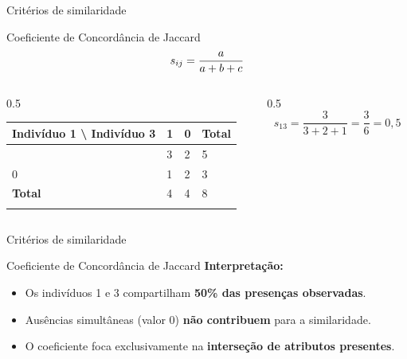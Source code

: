 \documentclass[
  ignorenonframetext,
  aspectratio=169,
]{beamer}
\providecommand{\tightlist}{%
  \setlength{\itemsep}{0pt}\setlength{\parskip}{0pt}}
\begin{document}
\begin{frame}{Critérios de similaridade}
\label{crituxe9rios-de-similaridade-4}
\begin{block}{Coeficiente de Concordância de Jaccard}
\label{coeficiente-de-concorduxe2ncia-de-jaccard}
\[\Large s_{ij} = \displaystyle{\frac{a}{a + b + c}}\]

\begin{columns}[T]
\begin{column}{0.5\linewidth}
\begin{longtable}[]{@{}llll@{}}
\toprule\noalign{}
Indivíduo 1 \textbackslash{} Indivíduo 3 & 1 & 0 & Total \\
\midrule\noalign{}
\endhead
1 & 3 & 2 & 5 \\
0 & 1 & 2 & 3 \\
\textbf{Total} & 4 & 4 & 8 \\
\bottomrule\noalign{}
\end{longtable}
\end{column}

\begin{column}{0.5\linewidth}
\[
s_{13} = \dfrac{3}{3 + 2 + 1}
       = \dfrac{3}{6}
       = 0,5
\]
\end{column}
\end{columns}
\end{block}
\end{frame}

\begin{frame}{Critérios de similaridade}
\label{crituxe9rios-de-similaridade-5}
\begin{block}{Coeficiente de Concordância de Jaccard}
\label{coeficiente-de-concorduxe2ncia-de-jaccard-1}
\textbf{Interpretação:}

\begin{itemize}
\tightlist
\item
  Os indivíduos 1 e 3 compartilham \textbf{50\% das presenças
  observadas}.
\item
  Ausências simultâneas (valor 0) \textbf{não contribuem} para a
  similaridade.
\item
  O coeficiente foca exclusivamente na \textbf{interseção de atributos
  presentes}.
\end{itemize}
\end{block}
\end{frame}
\end{document}
